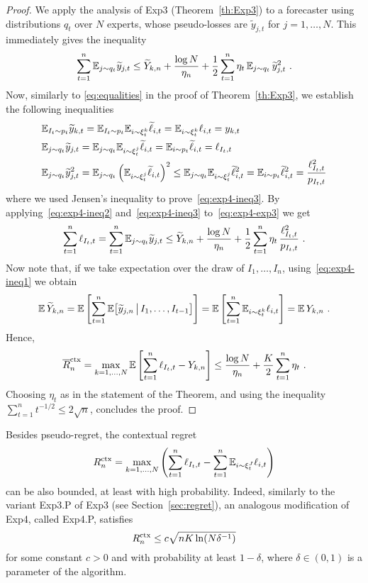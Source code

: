 \begin{proof}
We apply the analysis of Exp3 (Theorem~\ref{th:Exp3}) to a forecaster using distributions $q_t$ over $N$ experts, whose pseudo-losses are $\tilde{y}_{j,t}$ for $j=1,\dots,N$. This immediately gives the inequality
\begin{equation}
\label{eq:exp4-exp3}
	\sum_{t=1}^n \mathbb{E}_{j \sim q_t}\widetilde{y}_{j,t}
\le
	\widetilde{Y}_{k,n} + \frac{\log N}{\eta_n} + \frac{1}{2}\sum_{t=1}^n \eta_t\,\mathbb{E}_{j \sim q_t}\,\widetilde{y}_{j,t}^2~.
\end{equation}
Now, similarly to \eqref{eq:equalities} in the proof of Theorem~\ref{th:Exp3}, we establish the following inequalities
\begin{align}
\label{eq:exp4-ineq1}
	&\mathbb{E}_{I_t \sim p_t} \widetilde{y}_{k,t} = \mathbb{E}_{I_t \sim p_t} \mathbb{E}_{i \sim \xi_t^k} \widetilde{\ell}_{i,t} = \mathbb{E}_{i \sim \xi_t^k} \ell_{i,t} = y_{k,t}
\\
\label{eq:exp4-ineq2}
	&\mathbb{E}_{j \sim q_t} \widetilde{y}_{j,t} = \mathbb{E}_{j \sim q_t} \mathbb{E}_{i \sim \xi_t^j} \widetilde{\ell}_{i,t} = \mathbb{E}_{i \sim p_t} \widetilde{\ell}_{i,t} = \ell_{I_t,t}
\\
\label{eq:exp4-ineq3}
	&\mathbb{E}_{j \sim q_t} \widetilde{y}^2_{j,t} = \mathbb{E}_{j \sim q_t} \left(\mathbb{E}_{i \sim \xi_t^j} \widetilde{\ell}_{i,t}\right)^2 \le \mathbb{E}_{j \sim q_t} \mathbb{E}_{i \sim \xi_t^j} \widetilde{\ell}_{i,t}^2 = \mathbb{E}_{i \sim p_t} \widetilde{\ell}_{i,t}^2 = \frac{\ell_{I_t,t}^2}{p_{I_t,t}}
\end{align}
where we used Jensen's inequality to prove~\eqref{eq:exp4-ineq3}.
By applying~\eqref{eq:exp4-ineq2} and~\eqref{eq:exp4-ineq3} to~\eqref{eq:exp4-exp3} we get
\[
	\sum_{t=1}^n \ell_{I_t,t}
=
	\sum_{t=1}^n \mathbb{E}_{j \sim q_t} \widetilde{y}_{j,t}
\le
	\widetilde{Y}_{k,n} + \frac{\log N}{\eta_n} + \frac{1}{2}\sum_{t=1}^n \eta_t\,\frac{\ell_{I_t,t}^2}{p_{I_t,t}}~.
\]
Now note that, if we take expectation over the draw of $I_1,\dots,I_n$, using~\eqref{eq:exp4-ineq1} we obtain
\[
	\mathbb{E}\,\widetilde{Y}_{k,n} = \mathbb{E}\left[\sum_{t=1}^n \mathbb{E}\bigl[\widetilde{y}_{j,n} \,\big|\, I_1,\dots,I_{t-1} \bigr] \right] =  \mathbb{E}\left[\sum_{t=1}^n \mathbb{E}_{i \sim \xi_t^k} \ell_{i,t} \right] = \mathbb{E}\,Y_{k,n}~.
\]
Hence,
\[
	\overline{R}^{\mathrm{ctx}}_n = \max_{k=1,\dots,N} \mathbb{E}\left[ \sum_{t=1}^n \ell_{I_t,t} - Y_{k,n} \right]
\le
	 \frac{\log N}{\eta_n} + \frac{K}{2}\sum_{t=1}^n \eta_t~.
\]
Choosing $\eta_t$ as in the statement of the Theorem, and using the inequality $\sum_{t=1}^n t^{-1/2} \le 2\sqrt{n}$, concludes the proof.
\end{proof}
%
Besides pseudo-regret, the contextual regret
\[
	R^{\mathrm{ctx}}_n = \max_{k=1,\dots,N} \left( \sum_{t=1}^n \ell_{I_t,t} - \sum_{t=1}^n \mathbb{E}_{i \sim \xi_t^J} \ell_{i,t} \right)
\]
can be also bounded, at least with high probability. Indeed, similarly to the variant Exp3.P of Exp3 (see Section~\ref{sec:regret}), an analogous modification of Exp4, called Exp4.P, satisfies
\[
    R^{\mathrm{ctx}}_n \le c\sqrt{n K \ln(N \delta^{-1})}
\]
for some constant $c > 0$ and with probability at least $1-\delta$, where $\delta \in (0,1)$ is a parameter of the algorithm.


